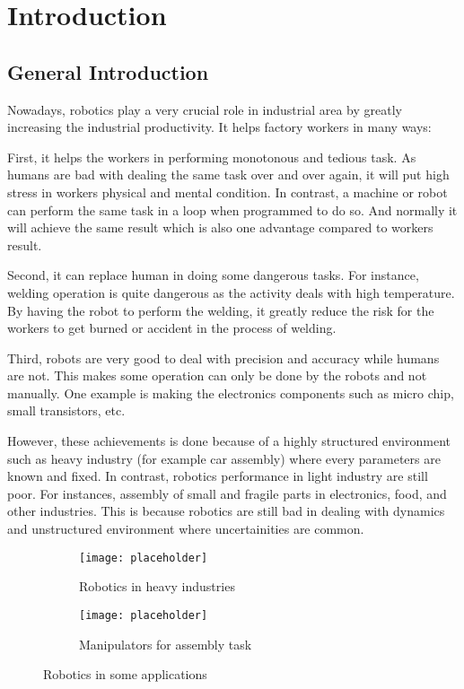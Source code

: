 \chapter{Introduction}
\section{General Introduction}

Nowadays, robotics play a very crucial role in industrial area by greatly increasing the industrial productivity. It helps factory workers in many ways:

First, it helps the workers in performing monotonous and tedious task. As humans are bad with dealing the same task over and over again, it will put high stress in workers physical and mental condition. In contrast, a machine or robot can perform the same task in a loop when programmed to do so. And normally it will achieve the same result which is also one advantage compared to workers result.

Second, it can replace human in doing some dangerous tasks. For instance, welding operation is quite dangerous as the activity deals with high temperature. By having the robot to perform the welding, it greatly reduce the risk for the workers to get burned or accident in the process of welding.

Third, robots are very good to deal with precision and accuracy while humans are not. This makes some operation can only be done by the robots and not manually. One example is making the electronics components such as micro chip, small transistors, etc. 

However, these achievements is done because of a highly structured environment such as heavy industry (for example car assembly) where every parameters are known and fixed. In contrast, robotics performance in light industry are still poor. For instances, assembly of small and fragile parts in electronics, food, and other industries. This is because robotics are still bad in dealing with dynamics and unstructured environment where uncertainities are common. 

\begin{figure}[h]
  \begin{subfigure}[t]{0.5\textwidth}
    \centering
    \texttt{[image: placeholder]} 
    \caption{Robotics in heavy industries}
  \end{subfigure}
  \begin{subfigure}[t]{0.5\textwidth}
    \centering
    \texttt{[image: placeholder]}
    \caption{Manipulators for assembly task}
  \end{subfigure}
  \caption{Robotics in some applications}
\end{figure}


